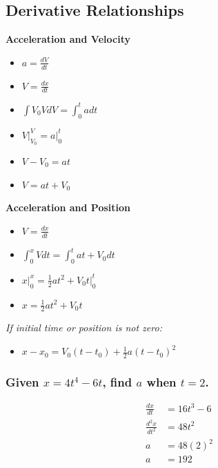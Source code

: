 \documentclass[
  letterpaper,
  DIV=11,
  numbers=noendperiod]{scrartcl}
\providecommand{\tightlist}{%
  \setlength{\itemsep}{0pt}\setlength{\parskip}{0pt}}\usepackage{longtable,booktabs,array}
\begin{document}
\newpage{}

\hypertarget{derivative-relationships}{%
\subsection{Derivative Relationships}\label{derivative-relationships}}

\textbf{Acceleration and Velocity}

\begin{itemize}
\tightlist
\item
  \(a = \frac{dV}{dt}\)
\item
  \(V = \frac{dx}{dt}\)
\item
  \(\int{V_0}{V} dV = \int_{0}^{t} a dt\)
\item
  \(V\rvert_{V_0}^{V} = a\rvert_{0}^{t}\)
\item
  \(V - V_0 = at\)
\item
  \(V = at + V_0\)
\end{itemize}

\textbf{Acceleration and Position}

\begin{itemize}
\tightlist
\item
  \(V = \frac{dx}{dt}\)
\item
  \(\int_{0}^{x} V dt = \int_{0}^{t} at + V_0 dt\)
\item
  \(x\rvert_{0}^{x} = \frac{1}{2}at^2 + V_0t\rvert_{0}^{t}\)
\item
  \(x = \frac{1}{2}at^2 + V_0t\)
\end{itemize}

\emph{If initial time or position is not zero:}

\begin{itemize}
\tightlist
\item
  \(x-x_0 = V_0(t-t_0) + \frac{1}{2}a(t-t_0)^2\)
\end{itemize}

\hypertarget{given-x4t4---6t-find-a-when-t2.}{%
\subsubsection{\texorpdfstring{Given \(x=4t^4 - 6t\), find \(a\) when
\(t=2\).}{Given x=4t\^{}4 - 6t, find a when t=2.}}\label{given-x4t4---6t-find-a-when-t2.}}

\begin{align*}
\frac{dx}{dt} &= 16t^3 - 6 \\
\frac{d^2x}{dt^2} &= 48t^2 \\
a &= 48(2)^2 \\
a &= 192
\end{align*}
\end{document}
